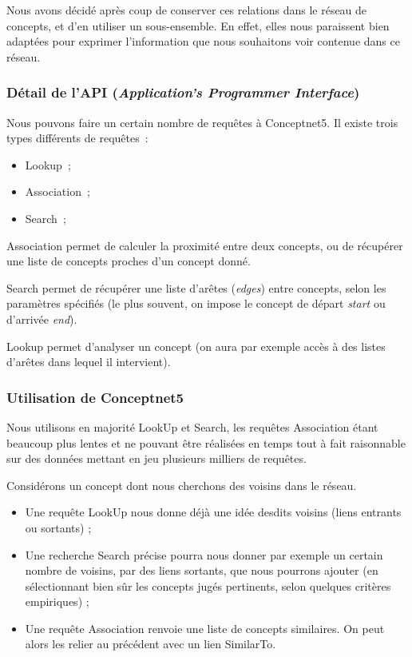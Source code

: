 \documentclass[a4paper, 12pt]{article}
\newcommand{\ang}[1]{\textit{#1}}%
\begin{document}
Nous avons décidé après coup de conserver ces relations dans le réseau de concepts, et d'en utiliser un sous-ensemble. En effet, elles nous paraissent bien adaptées pour exprimer l'information que nous souhaitons voir contenue dans ce réseau.

\subsubsection{Détail de l'API (\ang{Application's Programmer Interface})}

Nous pouvons faire un certain nombre de requêtes à Conceptnet5. Il existe trois types différents de requêtes~:
\begin{itemize}
 \item Lookup~;
 \item Association~;
 \item Search~;
\end{itemize}
Association permet de calculer la proximité entre deux concepts, ou de récupérer une liste de concepts proches d'un concept donné.

Search permet de récupérer une liste d'arêtes (\ang{edges}) entre concepts, selon les paramètres spécifiés (le plus souvent, on impose le concept de départ \ang{start} ou d'arrivée \ang{end}).

Lookup permet d'analyser un concept (on aura par exemple accès à des listes d'arêtes dans lequel il intervient).


\subsubsection{Utilisation de Conceptnet5}

Nous utilisons en majorité LookUp et Search, les requêtes Association étant beaucoup plus lentes et ne pouvant être réalisées en temps tout à fait raisonnable sur des données mettant en jeu plusieurs milliers de requêtes.

Considérons un concept dont nous cherchons des voisins dans le réseau.
\begin{itemize}
 \item Une requête LookUp nous donne déjà une idée desdits voisins (liens entrants ou sortants) ;
 \item Une recherche Search précise pourra nous donner par exemple un certain nombre de voisins, par des liens sortants, que nous pourrons ajouter (en sélectionnant bien sûr les concepts jugés pertinents, selon quelques critères empiriques) ;
 \item Une requête Association renvoie une liste de concepts similaires. On peut alors les relier au précédent avec un lien SimilarTo.
\end{itemize}
\end{document}
